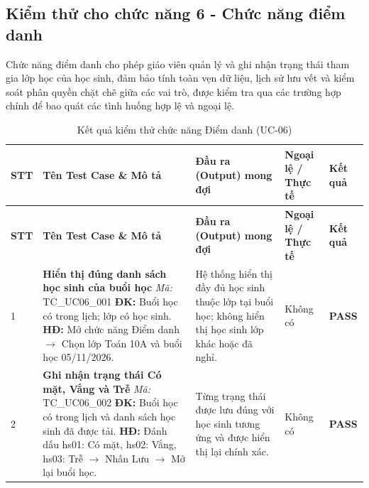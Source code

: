 \subsection{Kiểm thử cho chức năng 6 - Chức năng điểm danh}
Chức năng điểm danh cho phép giáo viên quản lý và ghi nhận trạng thái tham gia lớp học của học sinh, đảm bảo tính toàn vẹn dữ liệu, lịch sử lưu vết và kiểm soát phân quyền chặt chẽ giữa các vai trò, được kiểm tra qua các trường hợp chính để bao quát các tình huống hợp lệ và ngoại lệ.

\vspace{0.4em}
\begin{longtable}{|>{\centering\arraybackslash}p{0.8cm}|>{\raggedright\arraybackslash}p{4.6cm}|>{\raggedright\arraybackslash}p{3.8cm}|>{\raggedright\arraybackslash}p{3.8cm}|>{\centering\arraybackslash}p{1.5cm}|}
\caption{Kết quả kiểm thử chức năng Điểm danh (UC-06)}\label{tab:test-uc06}\\
\hline
\textbf{STT} & \textbf{Tên Test Case \& Mô tả} & \textbf{Đầu ra (Output) mong đợi} & \textbf{Ngoại lệ / Thực tế} & \textbf{Kết quả} \\
\hline
\endfirsthead
\hline
\textbf{STT} & \textbf{Tên Test Case \& Mô tả} & \textbf{Đầu ra (Output) mong đợi} & \textbf{Ngoại lệ / Thực tế} & \textbf{Kết quả} \\
\hline
\endhead

1 & \textbf{Hiển thị đúng danh sách học sinh của buổi học} \newline\newline \textit{Mã:} TC\_UC06\_001 \newline\newline \textbf{ĐK:} Buổi học có trong lịch; lớp có học sinh. \newline \textbf{HĐ:} Mở chức năng Điểm danh $\rightarrow$ Chọn lớp Toán 10A và buổi học 05/11/2026. 
& Hệ thống hiển thị đầy đủ học sinh thuộc lớp tại buổi học; không hiển thị học sinh lớp khác hoặc đã nghỉ. 
& Không có 
& \textbf{PASS} \\
\hline

2 & \textbf{Ghi nhận trạng thái Có mặt, Vắng và Trễ} \newline\newline \textit{Mã:} TC\_UC06\_002 \newline\newline \textbf{ĐK:} Buổi học có trong lịch và danh sách học sinh đã được tải. \newline \textbf{HĐ:} Đánh dấu hs01: Có mặt, hs02: Vắng, hs03: Trễ $\rightarrow$ Nhấn Lưu $\rightarrow$ Mở lại buổi học. 
& Từng trạng thái được lưu đúng với học sinh tương ứng và được hiển thị lại chính xác. 
& Không có 
& \textbf{PASS} \\
\hline


\end{longtable}
